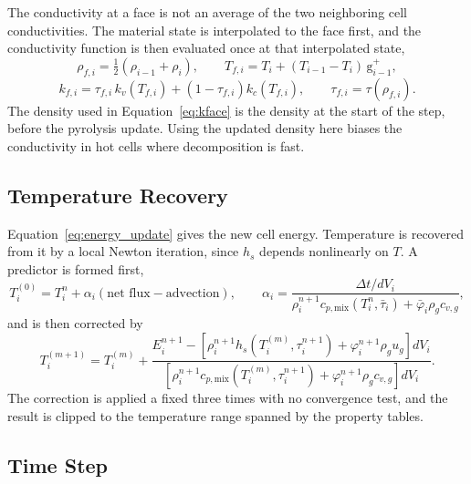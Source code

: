 \documentclass[11pt]{report}
\begin{document}
The conductivity at a face is not an average of the two neighboring cell
conductivities. The material state is interpolated to the face first, and the
conductivity function is then evaluated once at that interpolated state,
\begin{equation}
\rho_{f,i} = \tfrac12\left(\rho_{i-1} + \rho_i\right), \qquad
T_{f,i} = T_i + (T_{i-1} - T_i)\,\mathrm{g}^+_{i-1},
\end{equation}
\begin{equation}
k_{f,i} = \tau_{f,i}\, k_v(T_{f,i}) + \left(1 - \tau_{f,i}\right) k_c(T_{f,i}),
\qquad \tau_{f,i} = \tau(\rho_{f,i}).
\label{eq:kface}
\end{equation}
The density used in Equation~\eqref{eq:kface} is the density at the start of the
step, before the pyrolysis update. Using the updated density here biases the
conductivity in hot cells where decomposition is fast.

\subsection{Temperature Recovery}

Equation~\eqref{eq:energy_update} gives the new cell energy. Temperature is
recovered from it by a local Newton iteration, since $h_s$ depends nonlinearly on
$T$. A predictor is formed first,
\begin{equation}
T^{(0)}_i = T^n_i + \alpha_i\left(\text{net flux} - \text{advection}\right),
\qquad
\alpha_i = \frac{\Delta t / dV_i}{\rho^{n+1}_i c_{p,\mathrm{mix}}(T^n_i, \bar\tau_i)
  + \bar\varphi_i \rho_g c_{v,g}},
\end{equation}
and is then corrected by
\begin{equation}
T^{(m+1)}_i = T^{(m)}_i +
\frac{E^{n+1}_i - \left[\rho^{n+1}_i h_s(T^{(m)}_i, \tau^{n+1}_i)
  + \varphi^{n+1}_i \rho_g u_g\right] dV_i}
{\left[\rho^{n+1}_i c_{p,\mathrm{mix}}(T^{(m)}_i, \tau^{n+1}_i)
  + \varphi^{n+1}_i \rho_g c_{v,g}\right] dV_i}.
\label{eq:newton}
\end{equation}
The correction is applied a fixed three times with no convergence test, and the
result is clipped to the temperature range spanned by the property tables.

\subsection{Time Step}
\end{document}
